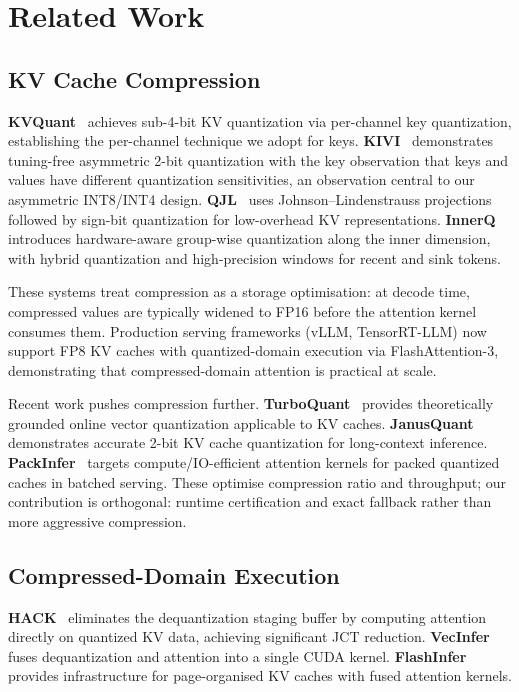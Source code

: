 \documentclass[10pt,twocolumn,a4paper]{article}
\theoremstyle{definition}
\theoremstyle{remark}
\begin{document}
\section{Related Work}
\label{sec:related}

\subsection{KV Cache Compression}

\textbf{KVQuant}~\cite{kvquant} achieves sub-4-bit KV quantization via per-channel key quantization, establishing the per-channel technique we adopt for keys.  \textbf{KIVI}~\cite{kivi} demonstrates tuning-free asymmetric 2-bit quantization with the key observation that keys and values have different quantization sensitivities, an observation central to our asymmetric INT8/INT4 design.  \textbf{QJL}~\cite{qjl} uses Johnson--Lindenstrauss projections followed by sign-bit quantization for low-overhead KV representations.  \textbf{InnerQ}~\cite{innerq} introduces hardware-aware group-wise quantization along the inner dimension, with hybrid quantization and high-precision windows for recent and sink tokens.

These systems treat compression as a storage optimisation: at decode time, compressed values are typically widened to FP16 before the attention kernel consumes them.  Production serving frameworks (vLLM, TensorRT-LLM) now support FP8 KV caches with quantized-domain execution via FlashAttention-3, demonstrating that compressed-domain attention is practical at scale.

Recent work pushes compression further.  \textbf{TurboQuant}~\cite{turboquant} provides theoretically grounded online vector quantization applicable to KV caches.  \textbf{JanusQuant}~\cite{janusquant} demonstrates accurate 2-bit KV cache quantization for long-context inference.  \textbf{PackInfer}~\cite{packinfer} targets compute/IO-efficient attention kernels for packed quantized caches in batched serving.  These optimise compression ratio and throughput; our contribution is orthogonal: runtime certification and exact fallback rather than more aggressive compression.

\subsection{Compressed-Domain Execution}

\textbf{HACK}~\cite{hack} eliminates the dequantization staging buffer by computing attention directly on quantized KV data, achieving significant JCT reduction.  \textbf{VecInfer}~\cite{vecinfer} fuses dequantization and attention into a single CUDA kernel.  \textbf{FlashInfer}~\cite{flashinfer} provides infrastructure for page-organised KV caches with fused attention kernels.
\end{document}
